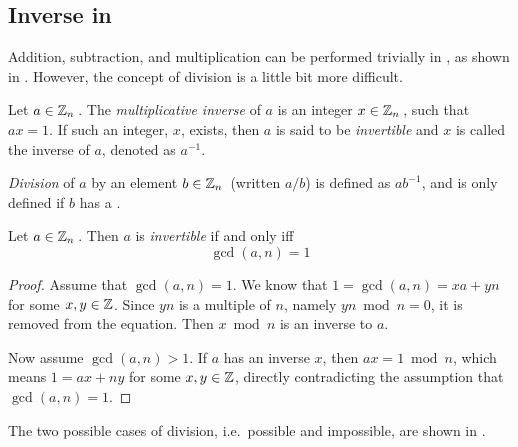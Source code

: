 \subsection{\texorpdfstring{Inverse in \TextIntsModN{}}{Inverse in Integers Modulo n}}\label{subsec:Inverse_Z_mod_n}
Addition, subtraction, and multiplication can be performed trivially in \TextIntsModN{}, as shown in .
However, the concept of division is a little bit more difficult.
\begin{definition}\label{def:Multiplicative_Inverse}
  Let $a \in \operatorname{\mathbb{Z}}_{n}{}$.
  The \emph{multiplicative inverse} of $a$ is an integer $x \in \operatorname{\mathbb{Z}}_{n}{}$, such that $ax = 1$.
  If such an integer, $x$, exists, then $a$ is said to be \emph{invertible} and $x$ is called the inverse of $a$, denoted as $a^{-1}$.
\end{definition}

\begin{definition}\label{def:Division_Z_mod_n}
  \emph{Division} of $a$ by an element $b \in \operatorname{\mathbb{Z}}_{n}{}$ (written $a/b$) is defined as $ab^{-1}$, and is only defined if $b$ has a .
\end{definition}

\begin{definition}[Invertible]\label{def:Invertible}
  Let $a \in \operatorname{\mathbb{Z}}_{n}{}$.
  Then $a$ is \emph{invertible} if and only iff
  \begin{equation}\label{eq:Invertible}
    \gcd(a, n) = 1
  \end{equation}
\end{definition}

\begin{proof}
  Assume that $\gcd(a, n) = 1$.
  We know that $1 = \gcd(a, n) = xa + yn$ for some $x, y \in \operatorname{\mathbb{Z}}$.
  Since $yn$ is a multiple of $n$, namely $yn \bmod n = 0$, it is removed from the equation.
  Then $x \bmod n$ is an inverse to $a$.

  Now assume $\gcd(a, n) > 1$.
  If $a$ has an inverse $x$, then $ax = 1 \bmod n$, which means $1 = ax + ny$ for some $x, y \in \operatorname{\mathbb{Z}}$, directly contradicting the assumption that $\gcd(a, n) = 1$.
\end{proof}

The two possible cases of division, i.e.\ possible and impossible, are shown in .

